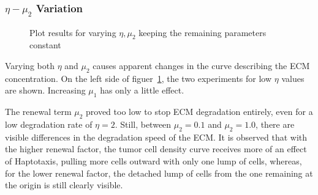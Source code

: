 \subsubsection*{$\eta -\mu_2$ Variation}
\begin{figure}[h!]
    \centering
    \caption{Plot results for varying $\eta,\mu_2$ keeping the remaining parameters constant}
    \label{fig:prolif_eta_mu_2_variation}
\end{figure}

Varying both $\eta$ and $\mu_2$ causes apparent changes in the curve describing the ECM concentration. On the left side of figuer~\ref{fig:prolif_eta_mu_2_variation}, the two experiments for low $\eta$ values are shown. Increasing $\mu_1$ has only a little effect. 

The renewal term $\mu_2$ proved too low to stop ECM degradation entirely, even for a low degradation rate of $\eta=2$. Still, between $\mu_2=0.1$ and $\mu_2=1.0$, there are visible differences in the degradation speed of the ECM. It is observed that with the higher renewal factor, the tumor cell density curve receives more of an effect of Haptotaxis, pulling more cells outward with only one lump of cells, whereas, for the lower renewal factor, the detached lump of cells from the one remaining at the origin is still clearly visible. 

